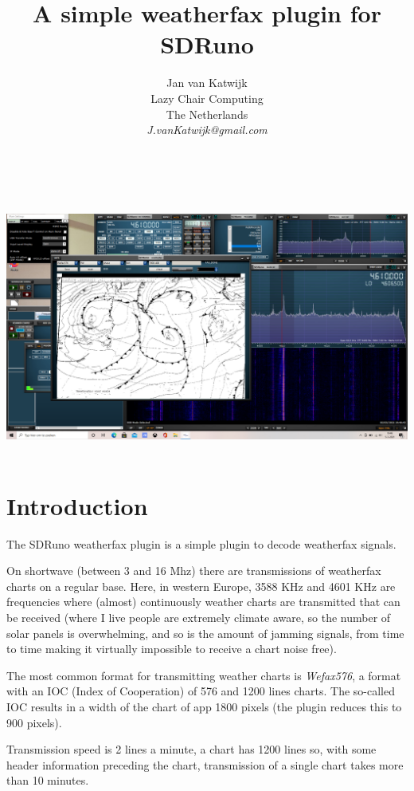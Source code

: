\documentclass[11pt]{article}
\begin{document}
\title{A simple weatherfax plugin for SDRuno}
\author{
Jan van Katwijk\\
Lazy Chair Computing \\
The Netherlands\\
{\em J.vanKatwijk@gmail.com}}
\maketitle
\ \\
\ \\
\includegraphics[width=150mm]{wfax-example.png}
\ \\
\section{Introduction}
The SDRuno weatherfax plugin is a simple plugin to decode weatherfax signals.

On shortwave (between 3 and 16 Mhz) there are
transmissions of weatherfax charts on a regular base.
Here, in western Europe, 3588 KHz and 4601 KHz are frequencies where
(almost) continuously weather charts are transmitted that can be received
(where I live people are extremely climate aware, so the number of
solar panels is overwhelming, and so is the amount of jamming signals,
from time to time making it virtually impossible
to receive a chart noise free).

The most common format for transmitting weather charts is
{\em Wefax576}, a format with an IOC (Index of Cooperation)
of 576 and 1200 lines charts.
The so-called IOC results in a width of the chart of
app 1800 pixels (the plugin reduces this to 900 pixels).

Transmission speed is 2 lines a minute, a chart has 1200 lines
so, with some header information preceding the chart, transmission
of a single chart takes more than 10 minutes.
\end{document}
